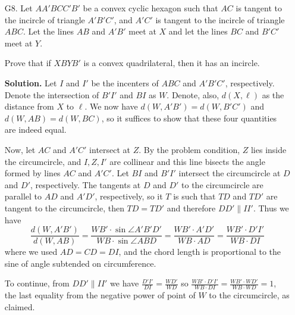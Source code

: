 \documentclass[11pt,a4paper]{article}
\begin{document}
\begin{enumerate}
    	\item [G8.]
    	Let $AA'BCC'B'$ be a convex cyclic hexagon such that $AC$ is tangent to the incircle of triangle $A'B'C'$, 
    	and $A'C'$ is tangent to the incircle of triangle $ABC$. 
    	Let the lines $AB$ and $A'B'$ meet at $X$ and let the lines $BC$ and $B'C'$ meet at $Y$.
    	
    	Prove that if $XBYB'$ is a convex quadrilateral, then it has an incircle.
    	
    	\textbf{Solution.} 
    	Let $I$ and $I'$ be the incenters of $ABC$ and $A'B'C'$, respectively. 
    	Denote the intersection of $B'I'$ and $BI$ as $W$. 
    	Denote, also, $d(X, \ell)$ as the distance from $X$ to $\ell$. 
    	We now have $d(W, A'B')=d(W, B'C')$ and $d(W, AB)=d(W, BC)$, 
    	so it suffices to show that these four quantities are indeed equal. 
    	
    	Now, let $AC$ and $A'C'$ intersect at $Z$. 
    	By the problem condition, $Z$ lies inside the circumcircle, and $I, Z, I'$ are collinear and this line bisects the angle formed by lines $AC$ and $A'C'$. 
    	Let $BI$ and $B'I'$ intersect the circumcircle at $D$ and $D'$, respectively. 
    	The tangents at $D$ and $D'$ to the circumcircle are parallel to $AD$ and $A'D'$, respectively, 
    	so it $T$ is such that $TD$ and $TD'$ are tangent to the circumcircle, 
    	then $TD=TD'$ and therefore $DD'\parallel II'$. 
    	Thus we have 
    	\[
    	\frac{d(W, A'B')}{d(W, AB)}
    	=\frac{WB'\cdot\sin\angle A'B'D'}{WB\cdot\sin\angle ABD}
    	=\frac{WB'\cdot A'D'}{WB\cdot AD}
    	=\frac{WB'\cdot D'I'}{WB\cdot DI}
    	\]
    	where we used $AD=CD=DI$, and the chord length is proportional to the sine of angle subtended on circumference. 
    	
    	To continue, from $DD'\parallel II'$ we have $\frac{D'I'}{DI} = \frac{WD'}{WD}$ so 
    	$\frac{WB'\cdot D'I'}{WB\cdot DI}=\frac{WB'\cdot WD'}{WB\cdot WD}=1$, 
    	the last equality from the negative power of point of $W$ to the circumcircle, as claimed. 
    	
    \end{enumerate}
    
\end{document}
